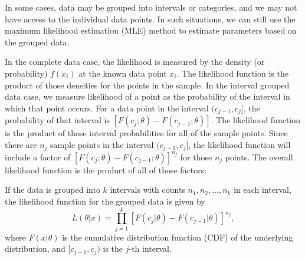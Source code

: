 In some cases, data may be grouped into intervals or categories, and we may not have access to the individual data points. In such situations, we can still use the maximum likelihood estimation (MLE) method to estimate parameters based on the grouped data.

In the complete data case, the likelihood is measured by the density (or probability) $f(x_i)$ at the known data point $x_i$. The likelihood function is the product of those densities for the points in the sample. In the interval grouped data case, we measure likelihood of a point as the probability of the interval in which that point occurs. For a data point in the interval $(c_{j-1}, c_j]$, the probability of that interval is $[F(c_j; \theta) - F(c_{j-1}; \theta)]$. The likelihood function is the product of those interval probabilities for all of the sample points. Since there are $n_j$ sample points in the interval $(c_{j-1}, c_j]$, the likelihood function will include a factor of $[F(c_j; \theta) - F(c_{j-1}; \theta)]^{n_j}$ for those $n_j$ points. The overall likelihood function is the product of all of those factors:

\begin{definition}
    If the data is grouped into $k$ intervals with counts $n_1, n_2, \ldots, n_k$ in each interval, the likelihood function for the grouped data is given by
    \[
        L(\theta|x) = \prod_{j=1}^{k} [F(c_j|\theta) - F(c_{j-1}|\theta)]^{n_j},
    \]
    where $F(x|\theta)$ is the cumulative distribution function (CDF) of the underlying distribution, and $[c_{j-1}, c_j)$ is the $j$-th interval.
\end{definition}

